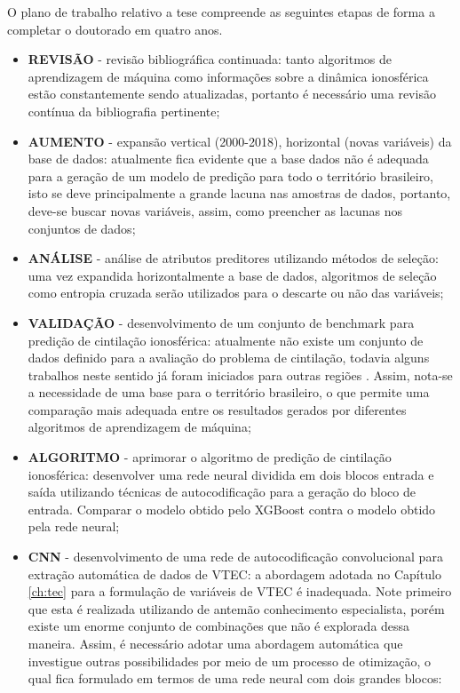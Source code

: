 O plano de trabalho relativo a tese compreende as seguintes etapas de forma a completar o doutorado em quatro anos.

\begin{itemize}
\item {\bf REVISÃO} - revisão bibliográfica continuada: tanto algoritmos de aprendizagem de máquina como informações sobre a dinâmica ionosférica estão constantemente sendo atualizadas, portanto é necessário uma revisão contínua da bibliografia pertinente;
\item {\bf AUMENTO} - expansão vertical (2000-2018), horizontal (novas variáveis) da base de dados: atualmente fica evidente que a base dados não é adequada para a geração de um modelo de predição para todo o território brasileiro, isto se deve principalmente a grande lacuna nas amostras de dados, portanto, deve-se buscar novas variáveis, assim, como preencher as lacunas nos conjuntos de dados;
\item {\bf ANÁLISE} - análise de atributos preditores utilizando métodos de seleção: uma vez expandida horizontalmente a base de dados, algoritmos de seleção como entropia cruzada serão utilizados para o descarte ou não das variáveis;
\item {\bf VALIDAÇÃO} - desenvolvimento de um conjunto de benchmark para predição de cintilação ionosférica: atualmente não existe um conjunto de dados definido para a avaliação do problema de cintilação, todavia alguns trabalhos neste sentido já foram iniciados para outras regiões \cite{MCGRANAGHAN:2018}. Assim, nota-se a necessidade de uma base para o território brasileiro, o que permite uma comparação mais adequada entre os resultados gerados por diferentes algoritmos de aprendizagem de máquina;
\item {\bf ALGORITMO} - aprimorar o algoritmo de predição de cintilação ionosférica: desenvolver uma rede neural dividida em dois blocos entrada e saída utilizando técnicas de autocodificação para a geração do bloco de entrada. Comparar o modelo obtido pelo XGBoost contra o modelo obtido pela rede neural;
\item {\bf CNN} - desenvolvimento de uma rede de autocodificação convolucional para extração automática de dados de VTEC: a abordagem adotada no Capítulo \ref{ch:tec} para a formulação de variáveis de VTEC é inadequada. Note primeiro que esta é realizada utilizando de antemão conhecimento especialista, porém existe um enorme conjunto de combinações que não é explorada dessa maneira. Assim, é necessário adotar uma abordagem automática que investigue outras possibilidades por meio de um processo de otimização, o qual fica formulado em termos de uma rede neural com dois grandes blocos: 

\end{itemize}
